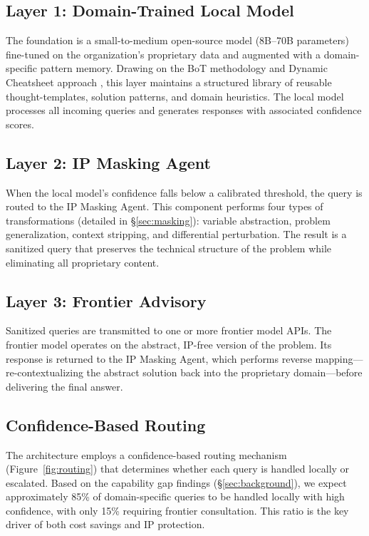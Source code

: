 \documentclass[11pt,a4paper]{article}
\begin{document}
\subsection{Layer 1: Domain-Trained Local Model}

The foundation is a small-to-medium open-source model (8B--70B parameters) fine-tuned on the organization's proprietary data and augmented with a domain-specific pattern memory. Drawing on the BoT methodology \citep{yang2024bot} and Dynamic Cheatsheet approach \citep{suzgun2025cheatsheet}, this layer maintains a structured library of reusable thought-templates, solution patterns, and domain heuristics. The local model processes all incoming queries and generates responses with associated confidence scores.

\subsection{Layer 2: IP Masking Agent}

When the local model's confidence falls below a calibrated threshold, the query is routed to the IP Masking Agent. This component performs four types of transformations (detailed in \S\ref{sec:masking}): variable abstraction, problem generalization, context stripping, and differential perturbation. The result is a sanitized query that preserves the technical structure of the problem while eliminating all proprietary content.

\subsection{Layer 3: Frontier Advisory}

Sanitized queries are transmitted to one or more frontier model APIs. The frontier model operates on the abstract, IP-free version of the problem. Its response is returned to the IP Masking Agent, which performs reverse mapping---re-contextualizing the abstract solution back into the proprietary domain---before delivering the final answer.

\subsection{Confidence-Based Routing}

The architecture employs a confidence-based routing mechanism (Figure~\ref{fig:routing}) that determines whether each query is handled locally or escalated. Based on the capability gap findings (\S\ref{sec:background}), we expect approximately 85\% of domain-specific queries to be handled locally with high confidence, with only 15\% requiring frontier consultation. This ratio is the key driver of both cost savings and IP protection.
\end{document}
